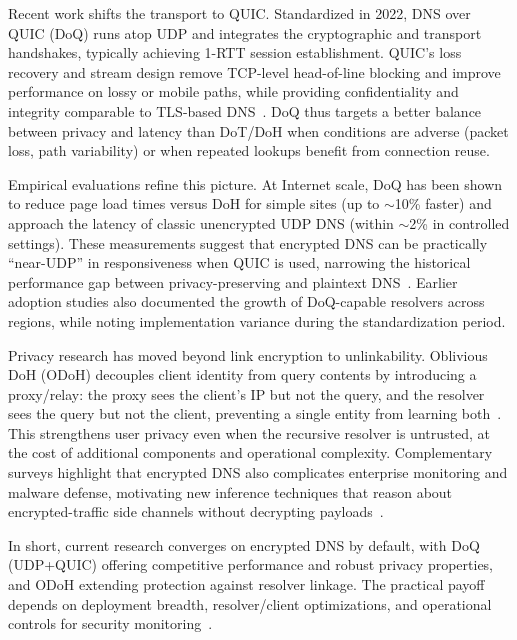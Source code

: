 Recent work shifts the transport to QUIC. Standardized in 2022, DNS over QUIC (DoQ) runs atop UDP and integrates the cryptographic and transport handshakes, typically achieving 1-RTT session establishment. QUIC’s loss recovery and stream design remove TCP-level head-of-line blocking and improve performance on lossy or mobile paths, while providing confidentiality and integrity comparable to TLS-based DNS~\cite{rfc9250}. DoQ thus targets a better balance between privacy and latency than DoT/DoH when conditions are adverse (packet loss, path variability) or when repeated lookups benefit from connection reuse.

Empirical evaluations refine this picture. At Internet scale, DoQ has been shown to reduce page load times versus DoH for simple sites (up to \(\sim\)10\% faster) and approach the latency of classic unencrypted UDP DNS (within \(\sim\)2\% in controlled settings). These measurements suggest that encrypted DNS can be practically ``near-UDP'' in responsiveness when QUIC is used, narrowing the historical performance gap between privacy-preserving and plaintext DNS~\cite{kosek2022doq}. Earlier adoption studies also documented the growth of DoQ-capable resolvers across regions, while noting implementation variance during the standardization period.

Privacy research has moved beyond link encryption to unlinkability. Oblivious DoH (ODoH) decouples client identity from query contents by introducing a proxy/relay: the proxy sees the client’s IP but not the query, and the resolver sees the query but not the client, preventing a single entity from learning both~\cite{rfc9230}. This strengthens user privacy even when the recursive resolver is untrusted, at the cost of additional components and operational complexity. Complementary surveys highlight that encrypted DNS also complicates enterprise monitoring and malware defense, motivating new inference techniques that reason about encrypted-traffic side channels without decrypting payloads~\cite{lyu2023survey}.

In short, current research converges on encrypted DNS by default, with DoQ (UDP+QUIC) offering competitive performance and robust privacy properties, and ODoH extending protection against resolver linkage. The practical payoff depends on deployment breadth, resolver/client optimizations, and operational controls for security monitoring~\cite{rfc9250,kosek2022doq,lyu2023survey,rfc9230}.
